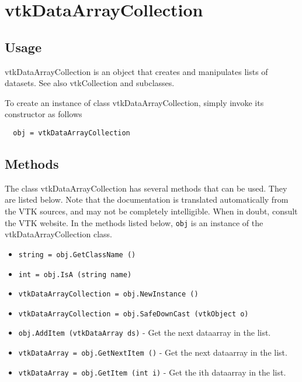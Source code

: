 \section{vtkDataArrayCollection}

\subsection{Usage}

 vtkDataArrayCollection is an object that creates and manipulates lists of
 datasets. See also vtkCollection and subclasses.

To create an instance of class vtkDataArrayCollection, simply
invoke its constructor as follows
\begin{verbatim}
  obj = vtkDataArrayCollection
\end{verbatim}
\subsection{Methods}

The class vtkDataArrayCollection has several methods that can be used.
  They are listed below.
Note that the documentation is translated automatically from the VTK sources,
and may not be completely intelligible.  When in doubt, consult the VTK website.
In the methods listed below, \verb|obj| is an instance of the vtkDataArrayCollection class.
\begin{itemize}
\item  \verb|string = obj.GetClassName ()|

\item  \verb|int = obj.IsA (string name)|

\item  \verb|vtkDataArrayCollection = obj.NewInstance ()|

\item  \verb|vtkDataArrayCollection = obj.SafeDownCast (vtkObject o)|

\item  \verb|obj.AddItem (vtkDataArray ds)| -  Get the next dataarray in the list.

\item  \verb|vtkDataArray = obj.GetNextItem ()| -  Get the next dataarray in the list.

\item  \verb|vtkDataArray = obj.GetItem (int i)| -  Get the ith dataarray in the list.

\end{itemize}
